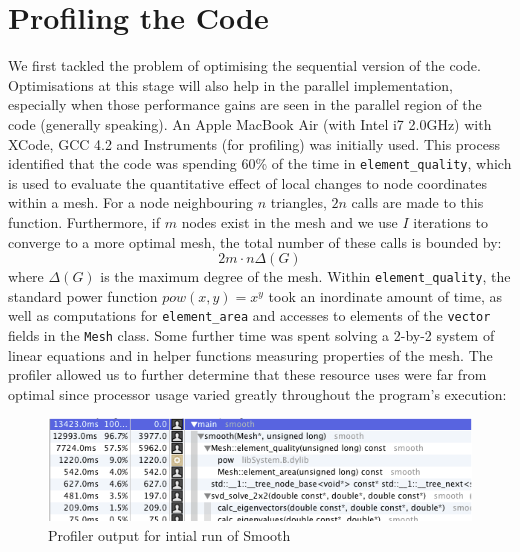 \documentclass[a4paper,12pt, twocolumn]{article}
\newenvironment{changemargin}[2]{\begin{list}{}{%
\setlength{\topsep}{0pt}%
\setlength{\leftmargin}{0pt}%
\setlength{\rightmargin}{0pt}%
\setlength{\listparindent}{\parindent}%
\setlength{\itemindent}{\parindent}%
\setlength{\parsep}{0pt plus 1pt}%
\addtolength{\leftmargin}{#1}%
\addtolength{\rightmargin}{#2}%
}\item }{\end{list}}
\begin{document}
\section{Profiling the Code}
We first tackled the problem of optimising the sequential version of the code.
Optimisations at this stage will also help in the parallel implementation, especially when those performance gains are seen in the parallel region of the code (generally speaking).
An Apple MacBook Air (with Intel i7 2.0GHz) with XCode, GCC 4.2 and Instruments (for profiling) was initially used.
This process identified that the code was spending 60\% of the time in \verb+element_quality+, which is used to evaluate the quantitative effect of local changes to node coordinates within a mesh.
For a node neighbouring $n$ triangles, $2n$ calls are made to this function.
Furthermore, if $m$ nodes exist in the mesh and we use $I$ iterations to converge to a more optimal mesh, the total number of these calls is bounded by:
$$
2m\cdot n\Delta(G)
$$
where $\Delta(G)$ is the maximum degree of the mesh.
Within \verb+element_quality+, the standard power function $pow(x, y) = x^y$ took an inordinate amount of time, as well as computations for \verb+element_area+ and accesses to elements of the \verb+vector+ fields in the \verb+Mesh+ class.
Some further time was spent solving a 2-by-2 system of linear equations and in helper functions measuring properties of the mesh.
The profiler allowed us to further determine that these resource uses were far from optimal since processor usage varied greatly throughout the program's execution:
\begin{figure}[!h]
\begin{changemargin}{-20mm}{-20mm}
\center
\includegraphics[scale=0.4]{profile.png}
\caption{Profiler output for intial run of Smooth}
\end{changemargin}
\end{figure}
\end{document}
